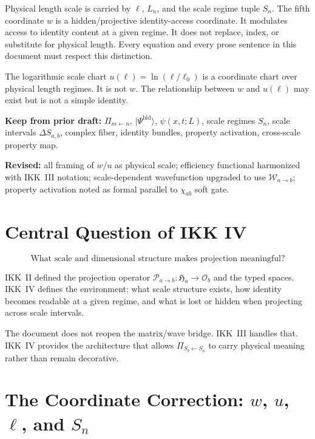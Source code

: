 \documentclass[11pt,a4paper,oneside]{article}
\newcommand{\Ha}{\mathfrak{H}_a}               %
\newcommand{\Osp}{\mathcal{O}_b}              %
\newcommand{\ellz}{\ell_0}                    %
\newcommand{\DSab}{\Delta S_{a,b}}             %
\newcommand{\wcoord}{w}
\newcommand{\uscale}{u(\ell)}                  %
\newcommand{\Pab}{\mathcal{P}_{a\to b}}        %
\newcommand{\PiS}[2]{\Pi_{S_{#2}\leftarrow S_{#1}}}  %
\newcommand{\Wab}{\mathcal{W}_{a\to b}}        %
\newcommand{\chiab}{\chi_{ab}}                 %
\begin{document}
Physical length scale is carried by $\ell$, $L_n$, and the scale regime tuple $S_n$. The fifth coordinate $\wcoord$ is a hidden/projective identity-access coordinate. It modulates access to identity content at a given regime. It does not replace, index, or substitute for physical length. Every equation and every prose sentence in this document must respect this distinction.

The logarithmic scale chart $\uscale = \ln(\ell/\ellz)$ is a coordinate chart over physical length regimes. It is not $\wcoord$. The relationship between $\wcoord$ and $\uscale$ may exist but is not a simple identity.

\textbf{Keep from prior draft:} $\Pi_{m\leftarrow n}$, $|\Psi^{\mathrm{hid}}\rangle$, $\psi(x,t;L)$, scale regimes $S_n$, scale intervals $\DSab$, complex fiber, identity bundles, property activation, cross-scale property map.

\textbf{Revised:} all framing of $w/u$ as physical scale; efficiency functional harmonized with IKK~III notation; scale-dependent wavefunction upgraded to use $\Wab$; property activation noted as formal parallel to $\chiab$ soft gate.

\section{Central Question of IKK IV}

\[
\boxed{\text{What scale and dimensional structure makes projection meaningful?}}
\]

IKK~II defined the projection operator $\Pab : \Ha \to \Osp$ and the typed spaces. IKK~IV defines the environment: what scale structure exists, how identity becomes readable at a given regime, and what is lost or hidden when projecting across scale intervals.

The document does not reopen the matrix/wave bridge. IKK~III handles that. IKK~IV provides the architecture that allows $\PiS{a}{b}$ to carry physical meaning rather than remain decorative.

\section{The Coordinate Correction: $w$, $u$, $\ell$, and $S_n$}
\end{document}
